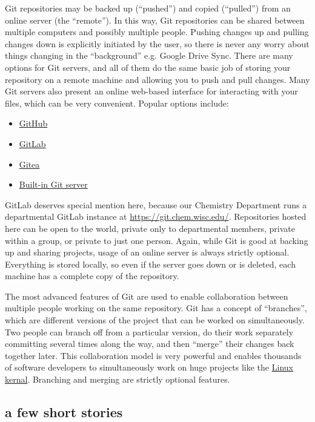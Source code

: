 \documentclass{training}
\begin{document}
Git repositories may be backed up (``pushed'') and copied (``pulled'') from an online server (the ``remote'').
In this way, Git repositories can be shared between multiple computers and possibly multiple people.
Pushing changes up and pulling changes down is explicitly initiated by the user, so there is never any worry about things changing in the ``background'' e.g. Google Drive Sync.
There are many options for Git servers, and all of them do the same basic job of storing your repository on a remote machine and allowing you to push and pull changes.
Many Git servers also present an online web-based interface for interacting with your files, which can be very convenient.
Popular options include:
\begin{itemize}
  \item \href{https://github.com/}{GitHub}
  \item \href{https://gitlab.com/}{GitLab}
  \item \href{https://gitea.io/}{Gitea}
  \item \href{https://git-scm.com/book/en/v2/Git-on-the-Server-Setting-Up-the-Server}{Built-in Git server}
\end{itemize}
GitLab deserves special mention here, because our Chemistry Department runs a departmental GitLab instance at \url{https://git.chem.wisc.edu/}.
Repositories hosted here can be open to the world, private only to departmental members, private within a group, or private to just one person.
Again, while Git is good at backing up and sharing projects, usage of an online server is always strictly optional.
Everything is stored locally, so even if the server goes down or is deleted, each machine has a complete copy of the repository.

The most advanced features of Git are used to enable collaboration between multiple people working on the same repository.
Git has a concept of ``branches'', which are different versions of the project that can be worked on simultaneously.
Two people can branch off from a particular version, do their work separately committing several times along the way, and then ``merge'' their changes back together later.
This collaboration model is very powerful and enables thousands of software developers to simultaneously work on huge projects like the \href{https://git.kernel.org/}{Linux kernal}.
Branching and merging are strictly optional features.

\subsection{a few short stories}
\end{document}
